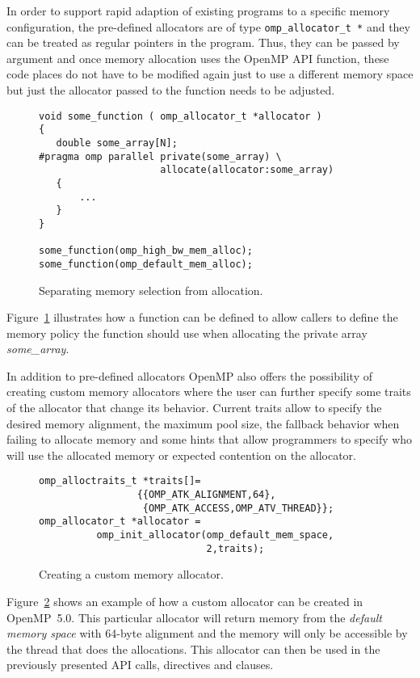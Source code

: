 In order to support rapid adaption of existing programs to a specific memory 
configuration, the pre-defined allocators are of type \texttt{omp\_allocator\_t *} and they can be treated as regular pointers in the program. Thus, they can be passed by argument and once 
memory allocation uses the OpenMP API function, these code places do not 
have to be modified again just to use a different memory space but just the allocator passed to the function needs to be adjusted.

\begin{figure}[htb]
\begin{verbatim}
void some_function ( omp_allocator_t *allocator )
{
   double some_array[N];
#pragma omp parallel private(some_array) \
                     allocate(allocator:some_array)
   {
       ...
   }
}

some_function(omp_high_bw_mem_alloc);
some_function(omp_default_mem_alloc);
\end{verbatim}
\caption{Separating memory selection from allocation.\label{fig:separation-concerns-alloc}}
\end{figure}

Figure~\ref{fig:separation-concerns-alloc} illustrates how a function can be defined to allow callers to define the memory policy the function should use when allocating the private array \emph{some\_array}.

In addition to pre-defined allocators OpenMP also offers the possibility of creating custom memory allocators where the user can further specify some traits of the allocator that change its behavior. Current traits allow to specify the desired memory alignment, the maximum pool size, the fallback behavior when failing to allocate memory and some hints that allow programmers to specify who will use the allocated memory or expected contention on the allocator.

\begin{figure}[hbt]
\begin{verbatim}
omp_alloctraits_t *traits[]=
                 {{OMP_ATK_ALIGNMENT,64},
                  {OMP_ATK_ACCESS,OMP_ATV_THREAD}};
omp_allocator_t *allocator = 
          omp_init_allocator(omp_default_mem_space,
                             2,traits);
\end{verbatim}
\caption{Creating a custom memory allocator.\label{fig:custom-allocator}}
\end{figure}

Figure~\ref{fig:custom-allocator} shows an example of how a custom allocator can be created in OpenMP~5.0. This particular allocator will return memory from the \emph{default memory space} with 64-byte alignment and the memory will only be accessible by the thread that does the allocations. This allocator can then be used in the previously presented API calls, directives and clauses.
